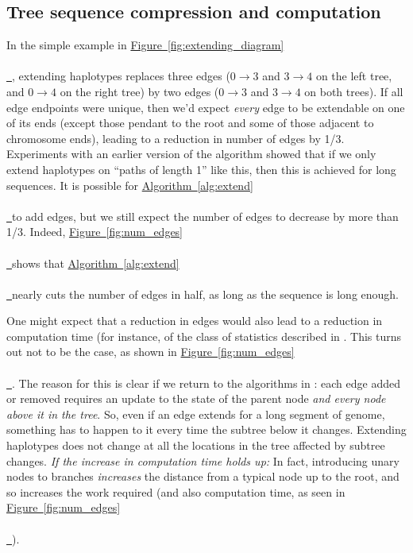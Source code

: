 \documentclass[10pt,twoside,lineno]{gsajnl}
\newcommand{\comment}[1]{{\color{violet} \it #1}}
\newcommand{\algorithmref}[2][]{%
	\hyperref[{#2}]{%
		Algorithm~\ref*{#2}%
		\ifx\\#1\\%
		\else
		\,#1%
		\fi
	}%
}
\newcommand*{\figref}[2][]{%
	\hyperref[{#2}]{%
		Figure~\ref*{#2}%
		\ifx\\#1\\%
		\else
		\,#1%
		\fi
	}%
}
\begin{document}

\subsection{Tree sequence compression and computation}

In the simple example in \figref{fig:extending_diagram},
extending haplotypes replaces three edges
($0 \to 3$ and $3 \to 4$ on the left tree, and $0 \to 4$ on the right tree)
by two edges ($0 \to 3$ and $3 \to 4$ on both trees).
If all edge endpoints were unique, then we'd expect \emph{every} edge to be extendable
on one of its ends
(except those pendant to the root and some of those adjacent to chromosome ends),
leading to a reduction in number of edges by 1/3.
Experiments with an earlier version of the algorithm showed that
if we only extend haplotypes on ``paths of length 1'' like this, 
then this is achieved for long sequences.
It is possible for \algorithmref{alg:extend} to add edges,
but we still expect the number of edges to decrease by more than 1/3.
Indeed,
\figref{fig:num_edges} shows that \algorithmref{alg:extend} nearly cuts the number of edges
in half, as long as the sequence is long enough.

One might expect that a reduction in edges would also lead to a reduction in computation time
(for instance, of the class of statistics described in \citet{ralph2020efficiently}.
This turns out not to be the case, as shown in \figref{fig:num_edges}.
The reason for this is clear if we
return to the algorithms in \citet{ralph2020efficiently}:
each edge added or removed requires an update
to the state of the parent node \emph{and every node above it in the tree}.
So, even if an edge extends for a long segment of genome,
something has to happen to it every time the subtree below it changes.
Extending haplotypes does not change at all the locations in the tree affected by subtree changes.
\comment{If the increase in computation time holds up:}
In fact, introducing unary nodes to branches
\emph{increases} the distance from a typical node up to the root,
and so increases the work required (and also computation time, as seen in \figref{fig:num_edges}).
\end{document}
